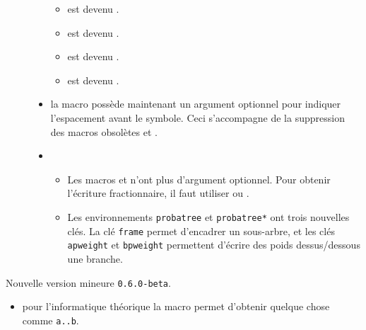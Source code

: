 \documentclass[12pt,a4paper]{book}
\begin{document}
\begin{description}
\begin{itemize}[itemsep=.5em]
\begin{itemize}[itemsep=.5em]
        \item {} est devenu .

        \item {} est devenu .

        \item {} est devenu .

        \item {} est devenu .
    \end{itemize}




    \item {}
	      la macro  possède maintenant un argument optionnel pour indiquer l'espacement avant le symbole.
          Ceci s'accompagne de la suppression des macros obsolètes  et .




    \item {}
    \begin{itemize}[itemsep=.5em]
        \item Les macros  et  n'ont plus d'argument optionnel. Pour obtenir l'écriture fractionnaire, il faut utiliser  ou .

        \item Les environnements \verb+probatree+ et \verb+probatree*+ ont trois nouvelles clés.
              La clé \verb+frame+ permet d'encadrer un sous-arbre, et les clés \verb+apweight+ et \verb+bpweight+ permettent d'écrire des poids dessus/dessous une branche.
    \end{itemize}
\end{itemize}

\end{description}\begin{description}
\medskip
\item[2019-10-10] Nouvelle version mineure \verb+0.6.0-beta+.

\begin{itemize}[itemsep=.5em]
    \item {}
    	  pour l'informatique théorique la macro  permet d'obtenir quelque chose comme \verb+a..b+.





\end{itemize}
\end{description}
\end{document}

